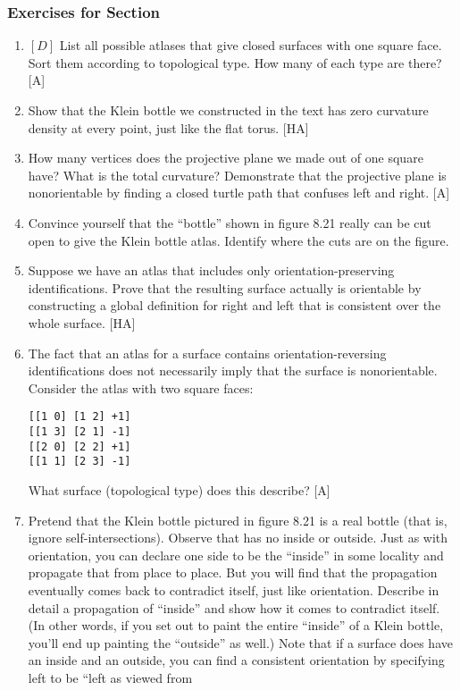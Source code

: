\documentclass{book}
\begin{document}
\subsubsection{Exercises for Section \thesection}
\begin{enumerate}
\item $[D]$ List all possible atlases that give closed surfaces with one square
face. Sort them according to topological type. How many of each type
are there? [A]
\item Show that the Klein bottle we constructed in the text has zero
curvature density at every point, just like the flat torus. [HA]
\item How many vertices does the projective plane we made out of one
square have? What is the total curvature? Demonstrate that the projective plane is nonorientable by finding a closed turtle path that confuses
left and right. [A]
\item Convince yourself that the ``bottle'' shown in figure 8.21 really can
be cut open to give the Klein bottle atlas. Identify where the cuts are
on the figure.
\item Suppose we have an atlas that includes only orientation-preserving
identifications. Prove that the resulting surface actually is orientable by
constructing a global definition for right and left that is consistent over
the whole surface. [HA]
\item The fact that an atlas for a surface contains orientation-reversing
identifications does not necessarily imply that the surface is nonorientable. Consider the atlas with two square faces:
\begin{verbatim}
[[1 0] [1 2] +1]
[[1 3] [2 1] -1]
[[2 0] [2 2] +1]
[[1 1] [2 3] -1]
\end{verbatim}What surface (topological type) does this describe? [A]
\item Pretend that the Klein bottle pictured in figure 8.21 is a real bottle
(that is, ignore self-intersections). Observe that has no inside or outside.
Just as with orientation, you can declare one side to be the ``inside'' in
some locality and propagate that from place to place. But you will find
that the propagation eventually comes back to contradict itself, just like
orientation. Describe in detail a propagation of ``inside'' and show how
it comes to contradict itself. (In other words, if you set out to paint the
entire ``inside'' of a Klein bottle, you'll end up painting the ``outside'' as
well.) Note that if a surface does have an inside and an outside, you can
find a consistent orientation by specifying left to be ``left as viewed from

\end{enumerate}
\end{document}
